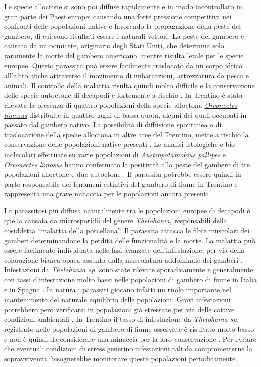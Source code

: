 \documentclass[10pt,twoside,openany,x11names,svgnames,italian,a5paper,dvipsnames,table]{memoir}
\begin{document}
Le specie alloctone si sono poi diffuse rapidamente e in modo incontrollato in gran parte dei Paesi europei causando una forte pressione competitiva nei confronti delle popolazioni native e favorendo la propagazione della peste del gambero, di cui sono risultati essere i naturali vettori. La peste del gambero è causata da un oomicete, originario degli Stati Uniti, che determina solo raramente la morte del gambero americano, mentre risulta letale per le specie europee. Questo parassita può essere facilmente traslocato da un corpo idrico all’altro anche attraverso il movimento di imbarcazioni, attrezzatura da pesca e animali. Il controllo della malattia risulta quindi molto difficile e la conservazione delle specie autoctone di decapodi è fortemente a rischio \cite{DAISIE}. In Trentino è stata rilevata la presenza di quattro popolazioni della specie alloctona \href{http://217.199.4.93/webgis}{\emph{Orconectes limosus}} distribuite in quattro laghi di bassa quota, alcuni dei quali occupati in passato dal gambero nativo. La possibilità di diffusione spontanea o di traslocazione della specie alloctona in altre aree del Trentino, mette a rischio la conservazione delle popolazioni native presenti \cite{Endrizzi13a}. Le analisi istologiche e bio-molecolari effettuate su varie popolazioni di \emph{Austropotamobius pallipes} e \emph{Orconectes limosus} hanno confermato la positività alla peste del gambero di tre popolazioni alloctone e due autoctone \cite{Minghetti} \cite{Pretto}. Il parassita potrebbe essere quindi in parte responsabile dei fenomeni estintivi del gambero di fiume in Trentino e rappresenta una grave minaccia per le popolazioni ancora presenti.


La parassitosi più diffusa naturalmente tra le popolazioni europee di decapodi è quella causata da microsporidii del genere \emph{Thelohania}, responsabili della cosiddetta “malattia della porcellana”. Il parassita attacca le fibre muscolari dei gamberi determinandone la perdita delle funzionalità e la morte. La malattia può essere facilmente individuata nelle fasi avanzate dell’infestazione, per via della colorazione bianca opaca assunta dalla muscolatura addominale dei gamberi \cite{Alderman}. Infestazioni da \emph{Thelohania sp.} sono state rilevate sporadicamente e generalmente con tassi d’infestazione molto bassi nelle popolazioni di gambero di fiume in Italia e in Spagna \cite{Mori} \cite{Dieguez}. In natura i parassiti giocano infatti un ruolo importante nel mantenimento del naturale equilibrio delle popolazioni. Gravi infestazioni potrebbero però verificarsi in popolazioni già stressate per via delle cattive condizioni ambientali \cite{Vogt}. In Trentino il tasso di infestazione da \emph{Thelohania sp.} registrato nelle popolazioni di gambero di fiume osservate è risultato molto basso \cite{Endrizzi13a} e non è quindi da considerare una minaccia per la loro conservazione \cite{Alderman}. Per evitare che eventuali condizioni di stress generino infestazioni tali da comprometterne la sopravvivenza, bisognerebbe monitorare queste popolazioni periodicamente.
\end{document}
